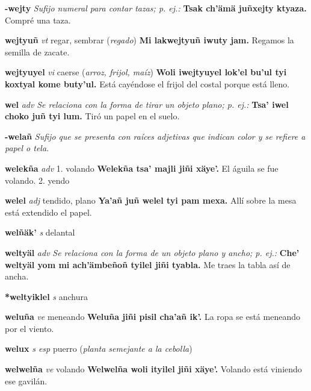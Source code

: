 \documentclass[10pt]{scrbook}
\newcommand{\entry}[1]{\textbf{#1}}
\newcommand{\onedefinition}[1]{#1.}
\newcommand{\nontranslationdef}[1]{\textit{#1}}
\newcommand{\partofspeech}[1]{\textit{#1}}
\newcommand{\spanishtranslation}[1]{#1}
\newcommand{\clarification}[1]{(\textit{#1})}
\newcommand{\cholexample}[1]{\textbf{#1}}
\newcommand{\exampletranslation}[1]{#1}
\begin{document}
\begin{multicols}{2}
\entry{-wejty}
\nontranslationdef{Sufijo numeral para contar tazas; p. ej.:}
\cholexample{Tsak ch'ämä juñxejty ktyaza.}
\exampletranslation{Compré una taza.}

\entry{wejtyuñ}
\partofspeech{vt}
\spanishtranslation{regar, sembrar}
\clarification{regado}
\cholexample{Mi lakwejtyuñ iwuty jam.}
\exampletranslation{Regamos la semilla de zacate.}

\entry{wejtyuyel}
\partofspeech{vi}
\spanishtranslation{caerse}
\clarification{arroz, frijol, maíz}
\cholexample{Woli iwejtyuyel lok'el bu'ul tyi koxtyal kome buty'ul.}
\exampletranslation{Está cayéndose el frijol del costal porque está lleno.}

\entry{wel}
\partofspeech{adv}
\nontranslationdef{Se relaciona con la forma de tirar un objeto plano; p. ej.:}
\cholexample{Tsa' iwel choko juñ tyi lum.}
\exampletranslation{Tiró un papel en el suelo.}

\entry{-welañ}
\nontranslationdef{Sufijo que se presenta con raíces adjetivas que indican color y se refiere a papel o tela.}

\entry{welekña}
\partofspeech{adv}
\onedefinition{1}
\spanishtranslation{volando}
\cholexample{Welekña tsa' majli jiñi xäye'.}
\exampletranslation{El águila se fue volando.}
\onedefinition{2}
\spanishtranslation{yendo}

\entry{welel}
\partofspeech{adj}
\spanishtranslation{tendido, plano}
\cholexample{Ya'añ juñ welel tyi pam mexa.}
\exampletranslation{Allí sobre la mesa está extendido el papel.}

\entry{welñäk'}
\partofspeech{s}
\spanishtranslation{delantal}

\entry{weltyäl}
\partofspeech{adv}
\nontranslationdef{Se relaciona con la forma de un objeto plano y ancho; p. ej.:}
\cholexample{Che' weltyäl yom mi ach'ämbeñoñ tyilel jiñi tyabla.}
\exampletranslation{Me traes la tabla así de ancha.}

\entry{*weltyiklel}
\partofspeech{s}
\spanishtranslation{anchura}

\entry{weluña}
\partofspeech{ve}
\spanishtranslation{meneando}
\cholexample{Weluña jiñi pisil cha'añ ik'.}
\exampletranslation{La ropa se está meneando por el viento.}

\entry{welux}
\partofspeech{s esp}
\spanishtranslation{puerro}
\clarification{planta semejante a la cebolla}

\entry{welwelña}
\partofspeech{ve}
\spanishtranslation{volando}
\cholexample{Welwelña woli ityilel jiñi xäye'.}
\exampletranslation{Volando está viniendo ese gavilán.}


\end{multicols}
\end{document}
